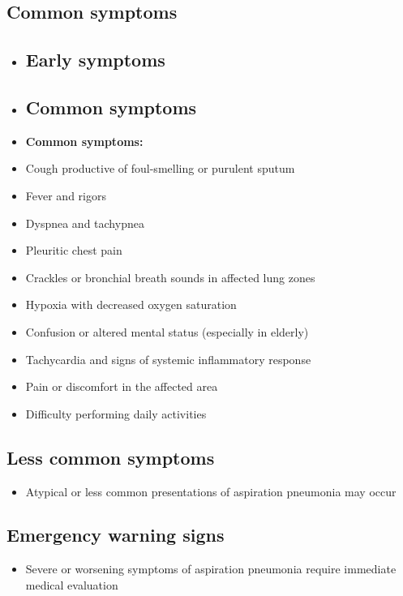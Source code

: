 \subsection{Common symptoms}
\begin{itemize}[noitemsep]
  \item \subsection{Early symptoms}
  \item \subsection{Common symptoms}
  \item \textbf{Common symptoms:}
  \item Cough productive of foul-smelling or purulent sputum
  \item Fever and rigors
  \item Dyspnea and tachypnea
  \item Pleuritic chest pain
  \item Crackles or bronchial breath sounds in affected lung zones
  \item Hypoxia with decreased oxygen saturation
  \item Confusion or altered mental status (especially in elderly)
  \item Tachycardia and signs of systemic inflammatory response
  \item Pain or discomfort in the affected area
  \item Difficulty performing daily activities
\end{itemize}

\subsection{Less common symptoms}
\begin{itemize}[noitemsep]
  \item Atypical or less common presentations of aspiration pneumonia may occur
\end{itemize}

\subsection{Emergency warning signs}
\begin{itemize}[noitemsep]
  \item Severe or worsening symptoms of aspiration pneumonia require immediate medical evaluation
\end{itemize}
